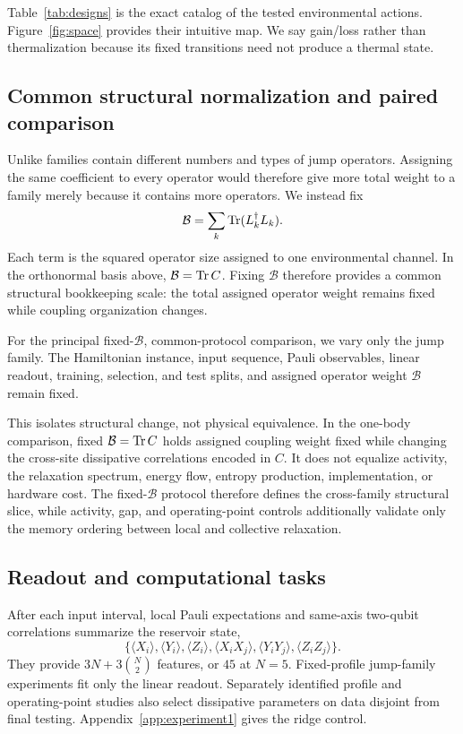 Table~\ref{tab:designs} is the exact catalog of the tested environmental
actions. Figure~\ref{fig:space} provides their intuitive map. We say gain/loss
rather than thermalization because its fixed transitions need not produce a
thermal state.

\subsection{Common structural normalization and paired comparison}

Unlike families contain different numbers and types of jump operators.
Assigning the same coefficient to every operator would therefore give more
total weight to a family merely because it contains more operators. We instead
fix
\begin{equation*}
\mathcal B=\sum_k\operatorname{Tr}(L_k^\dagger L_k).
\end{equation*}
Each term is the squared operator size assigned to one environmental channel.
In the orthonormal basis above, \(\mathcal B=\operatorname{Tr} C\). Fixing
\(\mathcal B\) therefore provides a common structural bookkeeping scale: the
total assigned operator weight remains fixed while coupling organization
changes.

For the principal fixed-\(\mathcal B\), common-protocol comparison, we vary
only the jump family. The Hamiltonian instance, input sequence, Pauli
observables, linear readout, training, selection, and test splits, and assigned
operator weight \(\mathcal B\) remain fixed.

This isolates structural change, not physical equivalence. In the one-body
comparison, fixed \(\mathcal B=\operatorname{Tr} C\)
holds assigned coupling weight fixed while changing the cross-site dissipative
correlations encoded in
\(C\). It does not equalize activity,
the relaxation spectrum, energy flow, entropy production, implementation, or
hardware cost. The fixed-\(\mathcal B\) protocol therefore defines the cross-family
structural slice, while activity, gap, and operating-point controls additionally
validate only the memory ordering between local and collective relaxation.

\subsection{Readout and computational tasks}

After each input interval, local Pauli expectations and same-axis two-qubit
correlations summarize the reservoir state,
\[
\{\langle X_i\rangle,\langle Y_i\rangle,\langle Z_i\rangle,
\langle X_iX_j\rangle,\langle Y_iY_j\rangle,\langle Z_iZ_j\rangle\}.
\]
They provide \(3N+3\binom{N}{2}\) features, or \(45\) at \(N=5\). Fixed-profile
jump-family experiments fit only the linear readout. Separately identified
profile and operating-point studies also select dissipative parameters on data disjoint
from final testing. Appendix~\ref{app:experiment1} gives the ridge control.

